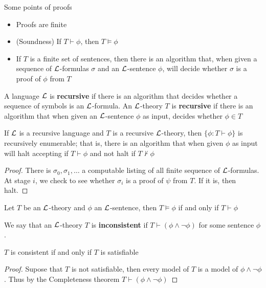 \documentclass[11pt]{article}
\begin{document}
Some points of proofs
\begin{itemize}
\item Proofs are finite
\item (Soundness) If \(T\vdash\phi\), then \(T\vDash\phi\)
\item If \(T\) is a finite set of sentences, then there is an algorithm that,
when given a sequence of \(\mathcal{L}\)-formulas \(\sigma\) and an \(\mathcal{L}\)-sentence \(\phi\),
will decide whether \(\sigma\) is a proof of \(\phi\) from \(T\)
\end{itemize}

A language \(\mathcal{L}\) is \textbf{recursive} if there is an algorithm that decides
whether a sequence of symbols is an \(\mathcal{L}\)-formula. An \(\mathcal{L}\)-theory
\(T\) is \textbf{recursive} if there is an algorithm that when given an
\(\mathcal{L}\)-sentence \(\phi\) as input, decides whether \(\phi\in T\)

\begin{proposition}[]
\label{prop2.1.1}
If \(\mathcal{L}\) is a recursive language and \(T\) is a recursive \(\mathcal{L}\)-theory,
then \(\{\phi:T\vdash\phi\}\) is recursively enumerable; that is, there is an
algorithm that when given \(\phi\) as input will halt accepting if \(T\vdash\phi\)
and not halt if \(T\not\vdash\phi\)
\end{proposition}
\begin{proof}
There is \(\sigma_0,\sigma_1,\dots\) a computable listing of all finite
sequence of \(\mathcal{L}\)-formulas. At stage \(i\), we check to see whether
\(\sigma_i\) is a proof of \(\psi\) from \(T\). If it is, then halt.
\end{proof}

\begin{theorem}
Let \(T\) be an \(\mathcal{L}\)-theory and \(\phi\) an \(\mathcal{L}\)-sentence, then
\(T\vDash\phi\) if and only if \(T\vdash \phi\)
\end{theorem}

We say that an \(\mathcal{L}\)-theory \(T\) is \textbf{inconsistent} if
\(T\vdash(\phi\wedge\neg\phi)\) for some sentence \(\phi\).

\begin{corollary}[]
\(T\) is consistent if and only if \(T\) is satisfiable
\end{corollary}

\begin{proof}
Supose that \(T\) is not satisfiable, then every model of \(T\) is a model of
\(\phi\wedge\neg\phi\). Thus by the Completeness theorem
\(T\vdash(\phi\wedge\neg\phi)\) 
\end{proof}
\end{document}

